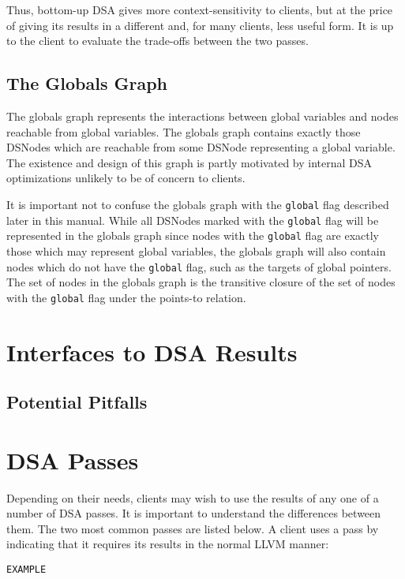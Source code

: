 \documentclass{article}
\begin{document}
Thus, bottom-up DSA gives more context-sensitivity to clients, but at
the price of giving its results in a different and, for many clients,
less useful form.  It is up to the client to evaluate the trade-offs
between the two passes.

\subsection{The Globals Graph}

The globals graph represents the interactions between global variables
and nodes reachable from global variables.  The globals graph contains
exactly those DSNodes which are reachable from some DSNode
representing a global variable.  The existence and design of this
graph is partly motivated by internal DSA optimizations unlikely to be
of concern to clients.

It is important not to confuse the globals graph with the
\texttt{global} flag described later in this manual.  While all
DSNodes marked with the \texttt{global} flag will be represented in
the globals graph since nodes with the \texttt{global} flag are
exactly those which may represent global variables, the globals graph
will also contain nodes which do not have the \texttt{global} flag,
such as the targets of global pointers.  The set of nodes in the
globals graph is the transitive closure of the set of nodes with the
\texttt{global} flag under the points-to relation.

\section{Interfaces to DSA Results}


\subsection{Potential Pitfalls}

\section{DSA Passes}

Depending on their needs, clients may wish to use the results of any
one of a number of DSA passes.  It is important to understand the
differences between them.  The two most common passes are listed
below.  A client uses a pass by indicating that it requires its
results in the normal LLVM manner:
\begin{verbatim}
EXAMPLE
\end{verbatim}
\end{document}
